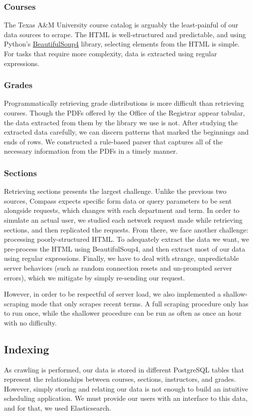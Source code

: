 \documentclass{article}
\begin{document}
\subsubsection{Courses}
The Texas A\&M University course catalog is arguably the least-painful of our data sources to scrape. The HTML is well-structured and predictable, and using Python's \href{https://www.crummy.com/software/BeautifulSoup/bs4/doc/}{BeautifulSoup4} library, selecting elements from the HTML is simple. For tasks that require more complexity, data is extracted using regular expressions.

\subsubsection{Grades}
Programmatically retrieving grade distributions is more difficult than retrieving courses. Though the PDFs offered by the Office of the Registrar appear tabular, the data extracted from them by the library we use is not. After studying the extracted data carefully, we can discern patterns that marked the beginnings and ends of rows. We constructed a rule-based parser that captures all of the necessary information from the PDFs in a timely manner.

\subsubsection{Sections}
Retrieving sections presents the largest challenge. Unlike the previous two sources, Compass expects specific form data or query parameters to be sent alongside requests, which changes with each department and term. In order to simulate an actual user, we studied each network request made while retrieving sections, and then replicated the requests. From there, we face another challenge: processing poorly-structured HTML. To adequately extract the data we want, we pre-process the HTML using BeautifulSoup4, and then extract most of our data using regular expressions. Finally, we have to deal with strange, unpredictable server behaviors (such as random connection resets and un-prompted server errors), which we mitigate by simply re-sending our request.

However, in order to be respectful of server load, we also implemented a shallow-scraping mode that only scrapes recent terms. A full scraping procedure only has to run once, while the shallower procedure can be run as often as once an hour with no difficulty.

\subsection{Indexing}
As crawling is performed, our data is stored in different PostgreSQL tables  that represent the relationships between courses, sections, instructors, and grades. However, simply storing and relating our data is not enough to build an intuitive scheduling application. We must provide our users with an interface to this data, and for that, we used Elasticsearch.
\end{document}
